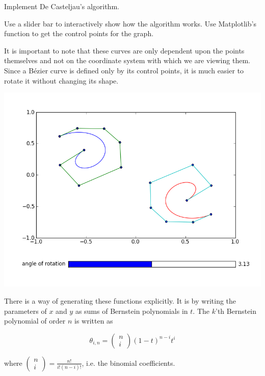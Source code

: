 \begin{problem}
Implement De Casteljau's algorithm.
\end{problem}

\begin{problem}
Use a slider bar to interactively show how the algorithm works. 
Use Matplotlib's  function to get the control points for the graph.
\end{problem}

It is important to note that these curves are only dependent upon the points themselves and not on the coordinate system with which we are viewing them. 
Since a B\'{e}zier curve is defined only by its control points, it is much easier to rotate it without changing its shape.

\includegraphics[width=\textwidth]{bezier_rotation}

There is a way of generating these functions explicitly. 
It is by writing the parameters of $x$ and $y$ as sums of Bernstein polynomials in $t$. 
The $k$'th Bernstein polynomial of order $n$ is written as 

$$\theta_{i,n}=\left( \begin{smallmatrix} n\\ i \end{smallmatrix} \right) (1-t)^{n-i} t^i$$

where $\left( \begin{smallmatrix} n\\ i \end{smallmatrix} \right) = \frac{n!}{i!(n-i)!}$, i.e. the binomial coefficients.

